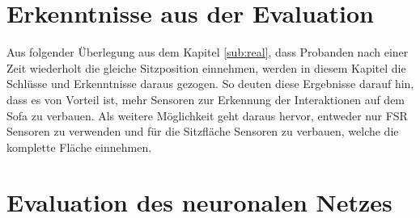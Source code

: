 \section{Erkenntnisse aus der Evaluation}
Aus folgender Überlegung aus dem Kapitel \ref{sub:real}, dass Probanden nach einer Zeit wiederholt die gleiche Sitzposition einnehmen, werden in diesem Kapitel die Schlüsse und Erkenntnisse daraus gezogen.
So deuten diese Ergebnisse darauf hin, dass es von Vorteil ist, mehr Sensoren zur Erkennung der Interaktionen auf dem Sofa zu verbauen. Als weitere Möglichkeit geht daraus hervor, entweder nur FSR Sensoren zu verwenden und für die Sitzfläche Sensoren zu verbauen, welche die komplette Fläche einnehmen.

\section{Evaluation des neuronalen Netzes}
\label{cha:eval_NN}

